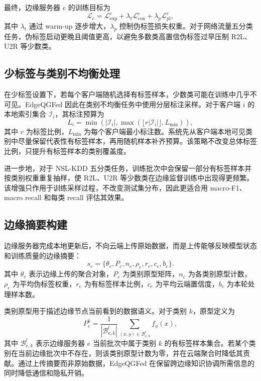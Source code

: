 \documentclass[journal]{IEEEtran}
\begin{document}
最终，边缘服务器 $e$ 的训练目标为
\begin{equation}
    \mathcal{L}_e =
    \mathcal{L}_{\mathrm{sup}}^e
    + \lambda_t \mathcal{L}_{\mathrm{con}}^e
    + \lambda_p \mathcal{L}_{\mathrm{pl}}^e,
    \label{eq:edge_loss}
\end{equation}
其中 $\lambda_t$ 通过 warm-up 逐步增大，$\lambda_p$ 控制伪标签损失权重。对于网络流量五分类任务，伪标签启动更晚且阈值更高，以避免多数类高置信伪标签过早压制 R2L、U2R 等少数类。

\subsection{少标签与类别不均衡处理}
\label{subsec:stratified_label}

在少标签设置下，若每个客户端随机选择有标签样本，少数类可能在训练中几乎不可见。EdgeQGFed 因此在类别不均衡任务中使用分层标注采样。对于客户端 $i$ 的本地索引集合 $\mathcal{I}_i$，其标注预算为
\begin{equation}
    L_i=\min\left(|\mathcal{I}_i|,\max(\lfloor r|\mathcal{I}_i|\rfloor,L_{\min})\right),
    \label{eq:label_budget}
\end{equation}
其中 $r$ 为标签比例，$L_{\min}$ 为每个客户端最小标注数。系统先从客户端本地可见类别中尽量保留代表性有标签样本，再用随机样本补齐预算。该策略不改变总体标签比例，只提升有标签样本的类别覆盖度。

进一步地，对于 NSL-KDD 五分类任务，训练批次中会保留一部分有标签样本并按类别权重重复抽样，使 R2L、U2R 等少数类在边缘监督训练中出现得更频繁。该增强只作用于训练采样过程，不改变测试集分布，因此更适合用 macro-F1、macro recall 和每类 recall 评估其效果。

\subsection{边缘摘要构建}
\label{subsec:summary}

边缘服务器完成本地更新后，不向云端上传原始数据，而是上传能够反映模型状态和训练质量的边缘摘要：
\begin{equation}
    s_e = \{\theta_e, P_e, n_e, \rho_e, r_e, c_e, b_e\}.
    \label{eq:summary}
\end{equation}
其中 $\theta_e$ 表示边缘上传的聚合对象，$P_e$ 为类别原型矩阵，$n_e$ 为各类别原型计数，$\rho_e$ 为平均伪标签权重，$r_e$ 为有标签样本比例，$c_e$ 为平均云端置信度，$b_e$ 为本轮处理样本数。

类别原型用于描述边缘节点当前看到的数据语义。对于类别 $k$，原型定义为
\begin{equation}
    P_e^k =
    \frac{1}{|\mathcal{B}_{e,k}^l|}
    \sum_{(x,y)\in\mathcal{B}_{e,k}^l} f_\phi(x),
    \label{eq:prototype}
\end{equation}
其中 $\mathcal{B}_{e,k}^l$ 表示边缘服务器 $e$ 当前批次中属于类别 $k$ 的有标签样本集合。若某个类别在当前边缘批次中不存在，则该类别原型计数为零，并在云端聚合时降低其贡献。通过上传摘要而非原始数据，EdgeQGFed 在保留跨边缘知识协调所需信息的同时降低通信和隐私开销。
\end{document}
